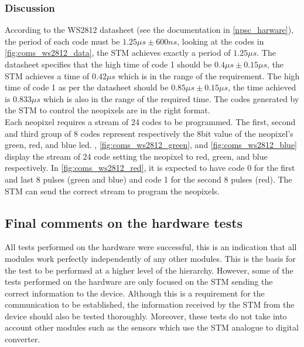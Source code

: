 \subsubsection{Discussion}
According to the WS2812 datasheet (see the documentation in \ref{npsc_harware}), the period of each code must be $ 1.25\mu s \pm 600ns$, looking at the codes in \ref{fig:coms_ws2812_data}, the STM achieves exactly a period of $1.25\mu s$. The datasheet specifies that the high time of code 1 should be $0.4\mu s \pm 0.15 \mu s$, the STM achieves a time of $0.42 \mu s$ which is in the range of the requirement. The high time of code 1 as per the datasheet should be $0.85 \mu s \pm 0.15 \mu s$, the time achieved is $0.833 \mu s$ which is also in the range of the required time. The codes generated by the STM to control the neopixels are in the right format.\\
Each neopixel requires a stream of 24 codes to be programmed. The first, second and third group of 8 codes represent respectively the 8bit value of the neopixel's green, red, and blue led. , \cref{fig:coms_ws2812_green}, and \cref{fig:coms_ws2812_blue} display the stream of 24 code setting the neopixel to red, green, and blue respectively. In \cref{fig:coms_ws2812_red}, it is expected to have code 0 for the first and last 8 pulses (green and blue) and code 1 for the second 8 pulses (red). The STM can send the correct stream to program the neopixels.

\subsection{Final comments on the hardware tests}
All tests performed on the hardware were successful, this is an indication that all modules work perfectly independently of any other modules. This is the basis for the test to be performed at a higher level of the hierarchy. However, some of the tests performed on the hardware are only focused on the STM sending the correct information to the device. Although this is a requirement for the communication to be established, the information received by the STM from the device should also be tested thoroughly. Moreover, these tests do not take into account other modules such as the sensors which use the STM analogue to digital converter.

